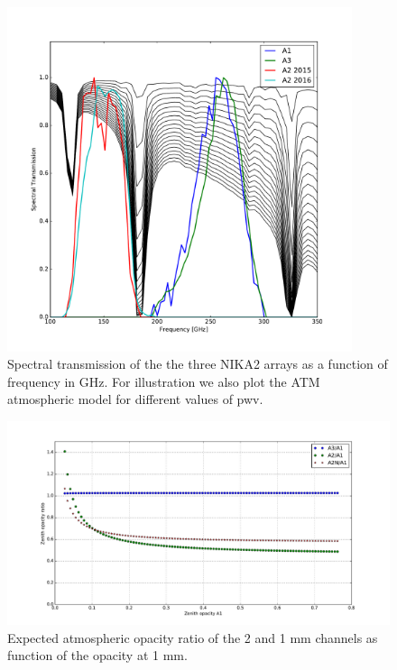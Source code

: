 \begin{figure}[ht] %
\begin{center}
\includegraphics[width=0.9\textwidth]{Figures/SpectralBands/atm_transmission.pdf}
\caption{Spectral transmission of the the three NIKA2 arrays as a function of frequency in GHz. For illustration we also plot the ATM atmospheric model for different values of pwv. \label{spectralband}}
\end{center}
\end{figure}


\begin{figure}[ht] %
\begin{center}
\includegraphics[width=\textwidth]{Figures/SpectralBands/opacity_ratio_vs_tau1.pdf}
\caption{Expected atmospheric opacity ratio of the 2 and 1 mm channels as function of the opacity at 1 mm. \label{thopacities}}
\end{center}
\end{figure}




